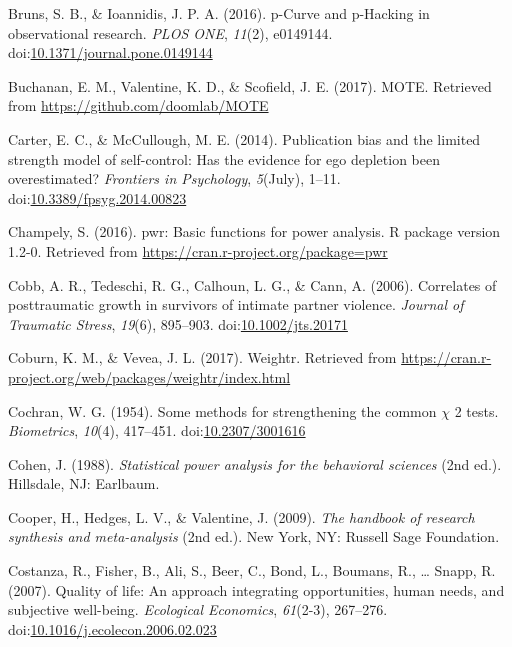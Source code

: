 \documentclass[man, mask]{apa6}
\theoremstyle{definition}
\theoremstyle{definition}
\theoremstyle{definition}
\theoremstyle{remark}
\begin{document}
\hypertarget{ref-Bruns2016}{}
Bruns, S. B., \& Ioannidis, J. P. A. (2016). p-Curve and p-Hacking in
observational research. \emph{PLOS ONE}, \emph{11}(2), e0149144.
doi:\href{https://doi.org/10.1371/journal.pone.0149144}{10.1371/journal.pone.0149144}

\hypertarget{ref-Buchanan2017}{}
Buchanan, E. M., Valentine, K. D., \& Scofield, J. E. (2017). MOTE.
Retrieved from \url{https://github.com/doomlab/MOTE}

\hypertarget{ref-Carter2014}{}
Carter, E. C., \& McCullough, M. E. (2014). Publication bias and the
limited strength model of self-control: Has the evidence for ego
depletion been overestimated? \emph{Frontiers in Psychology},
\emph{5}(July), 1--11.
doi:\href{https://doi.org/10.3389/fpsyg.2014.00823}{10.3389/fpsyg.2014.00823}

\hypertarget{ref-Champely2016}{}
Champely, S. (2016). pwr: Basic functions for power analysis. R package
version 1.2-0. Retrieved from
\url{https://cran.r-project.org/package=pwr}

\hypertarget{ref-Cobb2006}{}
Cobb, A. R., Tedeschi, R. G., Calhoun, L. G., \& Cann, A. (2006).
Correlates of posttraumatic growth in survivors of intimate partner
violence. \emph{Journal of Traumatic Stress}, \emph{19}(6), 895--903.
doi:\href{https://doi.org/10.1002/jts.20171}{10.1002/jts.20171}

\hypertarget{ref-Coburn2017}{}
Coburn, K. M., \& Vevea, J. L. (2017). Weightr. Retrieved from
\url{https://cran.r-project.org/web/packages/weightr/index.html}

\hypertarget{ref-Cochran1954}{}
Cochran, W. G. (1954). Some methods for strengthening the common
\(\chi\) 2 tests. \emph{Biometrics}, \emph{10}(4), 417--451.
doi:\href{https://doi.org/10.2307/3001616}{10.2307/3001616}

\hypertarget{ref-Cohen1988}{}
Cohen, J. (1988). \emph{Statistical power analysis for the behavioral
sciences} (2nd ed.). Hillsdale, NJ: Earlbaum.

\hypertarget{ref-Cooper2009}{}
Cooper, H., Hedges, L. V., \& Valentine, J. (2009). \emph{The handbook
of research synthesis and meta-analysis} (2nd ed.). New York, NY:
Russell Sage Foundation.

\hypertarget{ref-Costanza2007}{}
Costanza, R., Fisher, B., Ali, S., Beer, C., Bond, L., Boumans, R.,
\ldots{} Snapp, R. (2007). Quality of life: An approach integrating
opportunities, human needs, and subjective well-being. \emph{Ecological
Economics}, \emph{61}(2-3), 267--276.
doi:\href{https://doi.org/10.1016/j.ecolecon.2006.02.023}{10.1016/j.ecolecon.2006.02.023}
\end{document}
